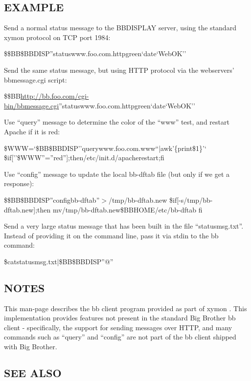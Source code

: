 \subsection{EXAMPLE}


 Send a normal status message to the BBDISPLAY server, using the
 standard xymon protocol on TCP port 1984:  

 
\$\$BB\$BBDISP''statuswww.foo.com.httpgreen`date`WebOK'' 


  Send the same status message, but using HTTP protocol via the webservers' bbmessage.cgi script:  
 
\$\$BB\url{http://bb.foo.com/cgi-bin/bbmessage.cgi}''statuswww.foo.com.httpgreen`date`WebOK'' 


  Use ``query'' message to determine the color of the ``www'' test, and restart Apache if it is red:  



\$WWW=`\$BB\$BBDISP''querywww.foo.com.www``|awk'\{print\$1\}'`  \$if[''\$WWW''=''red''];then/etc/init.d/apacherestart;fi 


  Use ``config'' message to update the local bb-dftab file (but only if we get a response):  


  
\$\$BB\$BBDISP''configbb-dftab''$>$/tmp/bb-dftab.new  
\$if[-s/tmp/bb-dftab.new];then  
mv/tmp/bb-dftab.new\$BBHOME/etc/bb-dftab  
fi 


  Send a very large status message that has been built in the file
  ``statusmsg.txt''. Instead of providing it on the command line, pass
  it via stdin to the bb command: 



  
\$catstatusmsg.txt|\$BB\$BBDISP''@'' 


 
\subsection{NOTES}
 This man-page describes the bb client program provided as part of
 xymon . This implementation provides features not present in the
 standard Big Brother bb client - specifically, the support for
 sending messages over HTTP, and many commands such as ``query'' and
 ``config'' are not part of the bb client shipped with Big Brother. 


 
\subsection{SEE ALSO}

